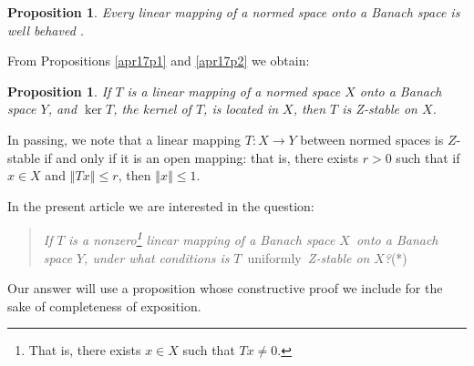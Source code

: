 \documentclass[11pt]{article}%
\newtheorem{proposition}[theorem]{Proposition}
\begin{document}
\begin{proposition}
\label{apr17p3}Every linear mapping of a normed space onto a Banach space is
well behaved \emph{\cite[Theorem 1]{BI1990}}.
\end{proposition}

From Propositions \ref{apr17p1} and \ref{apr17p2} we obtain:

\begin{proposition}
\label{apr22p1}If $T$ is a linear mapping of a normed space $X$ onto a Banach
space $Y$, and $\ker T$, the kernel of $T$, is located in $X$, then $T $ is
Z-stable on $X$.
\end{proposition}

In passing, we note that a linear mapping $T:X\rightarrow Y$ between normed
spaces is $Z$-stable if and only if it is an open mapping: that is, there
exists $r>0$ such that if $x\in X$ and $\left\Vert Tx\right\Vert \leq r$, then
$\left\Vert x\right\Vert \leq1$.%

\medskip


In the present article we are interested in the question:

\begin{quote}
\emph{If }$T$ \emph{is a nonzero\footnote{%
\normalfont\sf
That is, there exists $x\in X$ such that $Tx\neq0$.} linear mapping of a
Banach space }$X$\emph{\ onto a Banach space} $Y$\emph{, under what conditions
is }$T$\emph{\ }uniformly\emph{\ Z-stable on }$X$\emph{?}(*)
\end{quote}

%

\noindent
Our answer will use a proposition whose constructive proof we include for the
sake of completeness of exposition.
\end{document}

